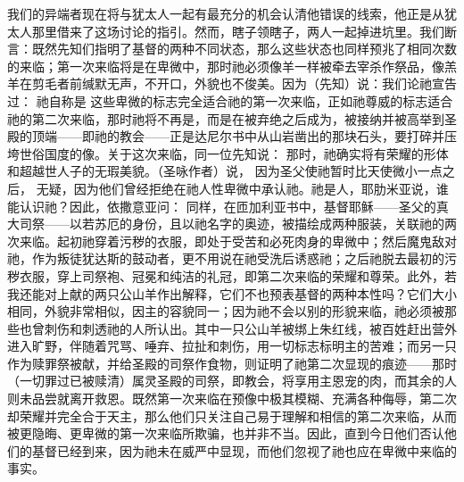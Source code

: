 我们的异端者现在将与犹太人一起有最充分的机会认清他错误的线索，他正是从犹太人那里借来了这场讨论的指引。然而，瞎子领瞎子，两人一起掉进坑里。我们断言：既然先知们指明了基督的两种不同状态，那么这些状态也同样预兆了相同次数的来临；第一次来临将是在卑微中，那时祂必须像羊一样被牵去宰杀作祭品，像羔羊在剪毛者前缄默无声，不开口，外貌也不俊美。因为（先知）说：我们论祂宣告过：     祂自称是 这些卑微的标志完全适合祂的第一次来临，正如祂尊威的标志适合祂的第二次来临，那时祂将不再是，而是在被弃绝之后成为，被接纳并被高举到圣殿的顶端——即祂的教会——正是达尼尔书中从山岩凿出的那块石头，要打碎并压垮世俗国度的像。关于这次来临，同一位先知说：  那时，祂确实将有荣耀的形体和超越世人子的无瑕美貌。（圣咏作者）说， 因为圣父使祂暂时比天使微小一点之后，  无疑，因为他们曾经拒绝在祂人性卑微中承认祂。祂是人，耶肋米亚说，谁能认识祂？因此，依撒意亚问：  同样，在匝加利亚书中，基督耶稣——圣父的真大司祭——以若苏厄的身份，且以祂名字的奥迹，被描绘成两种服装，关联祂的两次来临。起初祂穿着污秽的衣服，即处于受苦和必死肉身的卑微中；然后魔鬼敌对祂，作为叛徒犹达斯的鼓动者，更不用说在祂受洗后诱惑祂；之后祂脱去最初的污秽衣服，穿上司祭袍、冠冕和纯洁的礼冠，即第二次来临的荣耀和尊荣。此外，若我还能对上献的两只公山羊作出解释，它们不也预表基督的两种本性吗？它们大小相同，外貌非常相似，因主的容貌同一；因为祂不会以别的形貌来临，祂必须被那些也曾刺伤和刺透祂的人所认出。其中一只公山羊被绑上朱红线，被百姓赶出营外进入旷野，伴随着咒骂、唾弃、拉扯和刺伤，用一切标志标明主的苦难；而另一只作为赎罪祭被献，并给圣殿的司祭作食物，则证明了祂第二次显现的痕迹——那时（一切罪过已被赎清）属灵圣殿的司祭，即教会，将享用主恩宠的肉，而其余的人则未品尝就离开救恩。既然第一次来临在预像中极其模糊、充满各种侮辱，第二次却荣耀并完全合于天主，那么他们只关注自己易于理解和相信的第二次来临，从而被更隐晦、更卑微的第一次来临所欺骗，也并非不当。因此，直到今日他们否认他们的基督已经到来，因为祂未在威严中显现，而他们忽视了祂也应在卑微中来临的事实。\par

